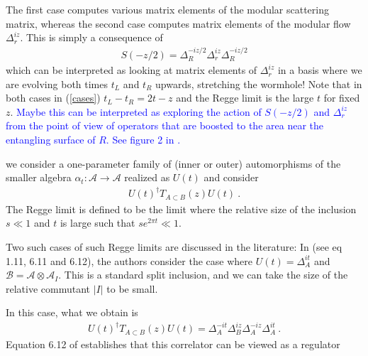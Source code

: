 \documentclass[a4paper,11pt]{article}
\theoremstyle{definition}
\newcommand{\mA}{\mathcal{A}}
\newcommand{\mB}{\mathcal{B}}
\newcommand{\nn}{\nonumber}
\newcommand{\mO}{\mathcal{O}}
\newcommand{\NL}[1]{\textcolor{blue}{#1}}
\begin{document}
The first case computes various matrix elements of the modular scattering matrix, whereas the second case computes matrix elements of the modular flow $\Delta_r^{iz}$. This is simply a consequence of 
\begin{eqnarray}
    S(-z/2)=\Delta^{-iz/2}_R \Delta_r^{iz}\Delta_R^{-iz/2}
\end{eqnarray}
which can be interpreted as looking at matrix elements of $\Delta_r^{iz}$ in a basis where we are evolving both times $t_L$ and $t_R$ upwards, stretching the wormhole! Note that in both cases in (\ref{cases}) $t_L-t_R=2t-z$ and the Regge limit is the large $t$ for fixed $z$. \NL{Maybe this can be interpreted as exploring the action of $S(-z/2)$ and $\Delta_r^{iz}$ from the point of view of operators that are boosted to the area near the entangling surface of $R$. See figure 2 in \cite{chandrasekaran2022scattering}.}








we consider a one-parameter family of (inner or outer) automorphisms of the smaller algebra $\alpha_t:\mA\to \mA$ realized as $U(t)$ and consider 
\begin{eqnarray}
    U(t)^\dagger T_{A\subset B}(z)U(t)\ .
\end{eqnarray}
The Regge limit is defined to be the limit where the relative size of the inclusion $s\ll 1$ and $t$ is large such that $s e^{2\pi t}\ll 1$. 

Two such cases of such Regge limits are discussed in the literature:
In \cite{chandrasekaran2022scattering} (see eq 1.11, 6.11 and 6.12), the authors consider the case where $U(t)=\Delta_A^{it}$ and $\mB=\mA \otimes \mA_I$. This is a standard split inclusion, and we can take the size of the relative commutant $|I|$ to be small.

In this case, what we obtain is
\begin{eqnarray}
 U(t)^\dagger T_{A\subset B}(z)U(t)=\Delta_A^{-it}\Delta_B^{iz}\Delta_A^{-iz}\Delta_A^{it}\ .
\end{eqnarray}
Equation 6.12 of \cite{chandrasekaran2022scattering} establishes that this correlator can be viewed as a regulator 
\end{document}
